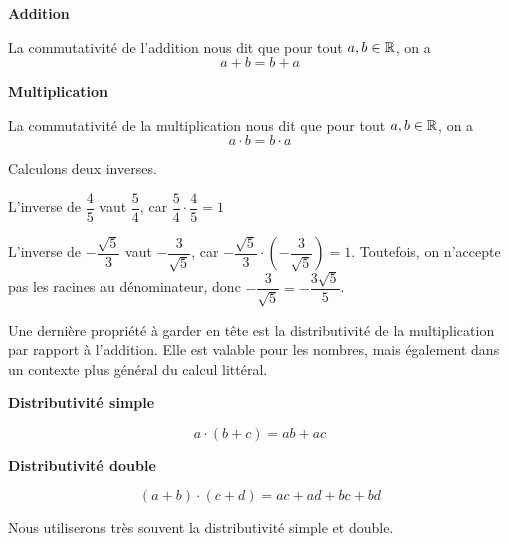 \documentclass[a4paper,12pt]{report}
\begin{document}
\begin{description}[leftmargin= 2cm]
		\begin{minipage}[t]{0.4\textwidth}{
		\vspace{0pt}
		{\bfseries Addition}

		La commutativité de l'addition nous dit que pour tout $a,b\in \mathbb R$, on a
		\[a+b=b+a\]
		}
		\end{minipage}
		\hfill
		\begin{minipage}[t]{0.4\textwidth}{
		\vspace{0pt}
		{\bfseries Multiplication}
	
		La commutativité de la multiplication nous dit que pour tout $a,b\in \mathbb R$, on a
		\[a\cdot b=b\cdot a\]
	}
		\end{minipage}
\end{description}
\begin{rem}
Calculons deux inverses.

L'inverse de $\dfrac{4}{5}$ vaut $\dfrac{5}{4}$, car $\dfrac{5}{4}\cdot \dfrac{4}{5}=1$

L'inverse de $-\dfrac{\sqrt{5}}{3}$ vaut $-\dfrac{3}{\sqrt{5}}$, car $-\dfrac{\sqrt{5}}{3}\cdot (-\dfrac{3}{\sqrt{5}})=1$.
Toutefois, on n'accepte pas les racines au dénominateur, donc $-\dfrac{3}{\sqrt{5}}=-\dfrac{3\sqrt{5}}{5}$.
\end{rem}
Une dernière propriété à garder en tête est la distributivité de la multiplication par rapport à l'addition. 
Elle est valable pour les nombres, mais également dans un contexte plus général du calcul littéral.

\begin{minipage}[t]{0.4\textwidth}{
\vspace{0pt}
\begin{center}
{\bfseries Distributivité simple}

\end{center}
\[a\cdot (b+c)=ab+ac\]
}\end{minipage}
\hfill
\begin{minipage}[t]{0.5\textwidth}{
\vspace{0pt}
\begin{center}
{\bfseries Distributivité double}

\end{center}
\[(a+b)\cdot (c+d)= ac+ad+bc+bd\]
}\end{minipage}

\vspace{1em}
Nous utiliserons très souvent la distributivité simple et double. 
\end{document}
